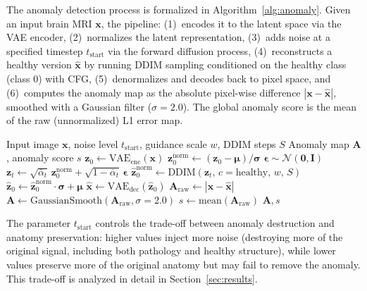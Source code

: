 The anomaly detection process is formalized in Algorithm~\ref{alg:anomaly}. Given an input brain MRI $\mathbf{x}$, the pipeline: (1)~encodes it to the latent space via the VAE encoder, (2)~normalizes the latent representation, (3)~adds noise at a specified timestep $t_{\text{start}}$ via the forward diffusion process, (4)~reconstructs a healthy version $\hat{\mathbf{x}}$ by running DDIM sampling conditioned on the healthy class (class 0) with CFG, (5)~denormalizes and decodes back to pixel space, and (6)~computes the anomaly map as the absolute pixel-wise difference $|\mathbf{x} - \hat{\mathbf{x}}|$, smoothed with a Gaussian filter ($\sigma = 2.0$). The global anomaly score is the mean of the raw (unnormalized) L1 error map.

\begin{algorithm}[H]
\caption{Diffusion-Based Anomaly Detection}
\label{alg:anomaly}
\begin{algorithmic}[1]
\REQUIRE Input image $\mathbf{x}$, noise level $t_{\text{start}}$, guidance scale $w$, DDIM steps $S$
\ENSURE Anomaly map $\mathbf{A}$, anomaly score $s$
\STATE $\mathbf{z}_0 \leftarrow \text{VAE}_{\text{enc}}(\mathbf{x})$ 
\STATE $\mathbf{z}_0^{\text{norm}} \leftarrow (\mathbf{z}_0 - \boldsymbol{\mu}) / \boldsymbol{\sigma}$ 
\STATE $\boldsymbol{\epsilon} \sim \mathcal{N}(\mathbf{0}, \mathbf{I})$
\STATE $\mathbf{z}_{t} \leftarrow \sqrt{\bar{\alpha}_{t}} \, \mathbf{z}_0^{\text{norm}} + \sqrt{1 - \bar{\alpha}_{t}} \, \boldsymbol{\epsilon}$ 
\STATE $\hat{\mathbf{z}}_0^{\text{norm}} \leftarrow \text{DDIM}(\mathbf{z}_{t},\, c{=}\text{healthy},\, w,\, S)$ 
\STATE $\hat{\mathbf{z}}_0 \leftarrow \hat{\mathbf{z}}_0^{\text{norm}} \cdot \boldsymbol{\sigma} + \boldsymbol{\mu}$ 
\STATE $\hat{\mathbf{x}} \leftarrow \text{VAE}_{\text{dec}}(\hat{\mathbf{z}}_0)$ 
\STATE $\mathbf{A}_{\text{raw}} \leftarrow |\mathbf{x} - \hat{\mathbf{x}}|$
\STATE $\mathbf{A} \leftarrow \text{GaussianSmooth}(\mathbf{A}_{\text{raw}}, \sigma{=}2.0)$
\STATE $s \leftarrow \text{mean}(\mathbf{A}_{\text{raw}})$ 
\RETURN $\mathbf{A}, s$
\end{algorithmic}
\end{algorithm}

The parameter $t_{\text{start}}$ controls the trade-off between anomaly destruction and anatomy preservation: higher values inject more noise (destroying more of the original signal, including both pathology and healthy structure), while lower values preserve more of the original anatomy but may fail to remove the anomaly. This trade-off is analyzed in detail in Section~\ref{sec:results}.

